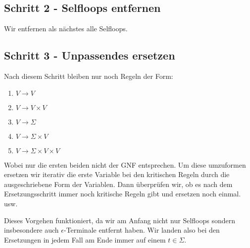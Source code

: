 \documentclass{article}
\begin{document}
\subsection*{Schritt 2 - Selfloops entfernen}
Wir entfernen als nächstes alle Selfloops.

\subsection*{Schritt 3 - Unpassendes ersetzen}
Nach diesem Schritt bleiben nur noch Regeln der Form:
\begin{enumerate}
  \item $V \rightarrow V$
  \item $V \rightarrow V\times V$
  \item $V \rightarrow \Sigma$
  \item $V \rightarrow \Sigma \times V$
  \item $V \rightarrow \Sigma \times V \times V$
\end{enumerate}
Wobei nur die ersten beiden nicht der GNF entsprechen. Um diese umzuformen ersetzen wir iterativ die erste Variable bei den kritischen Regeln durch die ausgeschriebene Form der Variablen. Dann überprüfen wir, ob es nach dem Ersetzungsschritt immer noch kritische Regeln gibt und ersetzen noch einmal. usw.

Dieses Vorgehen funktioniert, da wir am Anfang nicht nur Selfloops sondern insbesondere auch $\epsilon$-Terminale entfernt haben. Wir landen also bei den Ersetzungen in jedem Fall am Ende immer auf einem $t \in \Sigma$.

\newpage
\end{document}
